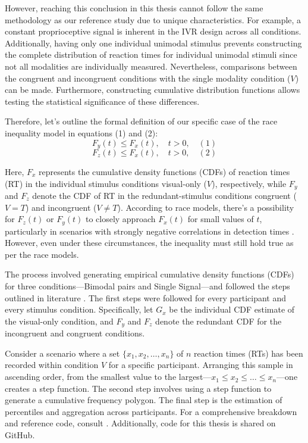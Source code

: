 \documentclass[12pt,oneside,openright]{report}
\begin{document}
However, reaching this conclusion in this thesis cannot follow the same methodology as our reference study due to unique characteristics. For example, a constant proprioceptive signal is inherent in the IVR design across all conditions. Additionally, having only one individual unimodal stimulus prevents constructing the complete distribution of reaction times for individual unimodal stimuli since not all modalities are individually measured. Nevertheless, comparisons between the congruent and incongruent conditions with the single modality condition ($V$) can be made. Furthermore, constructing cumulative distribution functions allows testing the statistical significance of these differences.

Therefore, let's outline the formal definition of our specific case of the race inequality model in equations (1) and (2):
\[
F_y(t) \leq F_x(t), \quad t > 0, \quad (1)
\]
\[
F_z(t) \leq F_x(t), \quad t > 0, \quad (2)
\]

Here, $F_x$ represents the cumulative density functions (CDFs) of reaction times (RT) in the individual stimulus conditions visual-only ($V$), respectively, while $F_y$ and $F_z$ denote the CDF of RT in the redundant-stimulus conditions congruent ($V=T$) and incongruent ($V \neq T$). According to race models, there's a possibility for $F_z(t)$ or $F_y(t)$ to closely approach $F_x(t)$ for small values of $t$, particularly in scenarios with strongly negative correlations in detection times \parencite*{Ulrich2007}. However, even under these circumstances, the inequality must still hold true as per the race models.

The process involved generating empirical cumulative density functions (CDFs) for three conditions—Bimodal pairs and Single Signal—and followed the steps outlined in literature \parencite*{Ulrich2007}. The first steps were followed for every participant and every stimulus condition. Specifically, let $G_x$ be the individual CDF estimate of the visual-only condition, and $F_y$ and $F_z$ denote the redundant CDF for the incongruent and congruent conditions.

Consider a scenario where a set $\{x_1, x_2, \ldots , x_n\}$ of $n$ reaction times (RTs) has been recorded within condition $V$ for a specific participant. Arranging this sample in ascending order, from the smallest value to the largest—$x_1 \leq x_2 \leq \ldots \leq x_n$—one creates a step function. The second step involves using a step function to generate a cumulative frequency polygon. The final step is the estimation of percentiles and aggregation across participants. For a comprehensive breakdown and reference code, consult \cite{Ulrich2007}. Additionally, code for this thesis is shared on GitHub.
\end{document}
